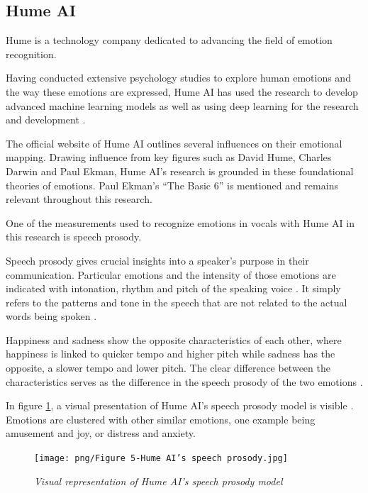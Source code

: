  

\subsection{Hume AI }

Hume is a technology company dedicated to advancing the field of emotion recognition.

Having conducted extensive psychology studies to explore human emotions and the way these emotions are expressed, Hume AI has used the research to develop advanced machine learning models \autocite{HumeAi-aboutScience} as well as using deep learning for the research and development \autocite{Brooks2023}.

 The official website of Hume AI outlines several influences on their emotional mapping. Drawing influence from key figures such as David Hume, Charles Darwin and Paul Ekman, Hume AI’s research is grounded in these foundational theories of emotions. Paul Ekman’s “The Basic 6” is mentioned \autocite{HumeAI-AboutHume} and remains relevant throughout this research. 

 One of the measurements used to recognize emotions in vocals with Hume AI in this research is speech prosody. 

Speech prosody gives crucial insights into a speaker’s purpose in their communication. Particular emotions and the intensity of those emotions are indicated with intonation, rhythm and pitch of the speaking voice \autocite{Thompson2004}\autocite{Tomasello2022}. It simply refers to the patterns and tone in the speech that are not related to the actual words being spoken \autocite{Cowen2019}.

Happiness and sadness show the opposite characteristics of each other, where happiness is linked to quicker tempo and higher pitch while sadness has the opposite, a slower tempo and lower pitch. The clear difference between the characteristics serves as the difference in the speech prosody of the two emotions \autocite{Thompson2004}. 

 In figure \ref{fig:hume-ai-speech-prosody}, a visual presentation of Hume AI’s speech prosody model is visible \autocite{HumeAIProsody}. Emotions are clustered with other similar emotions, one example being amusement and joy, or distress and anxiety.
\begin{figure}[ht]
    \centering
    \texttt{[image: png/Figure 5-Hume AI’s speech prosody.jpg]}
    \caption{\textit{Visual representation of Hume AI’s speech prosody model} \autocite{HumeAIProsody}}
    \label{fig:hume-ai-speech-prosody}
\end{figure}

